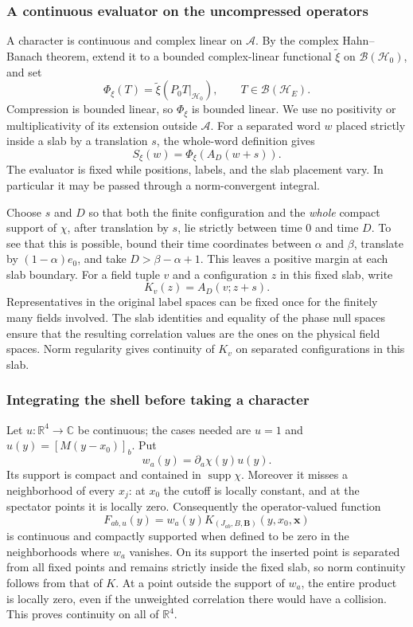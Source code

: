 \subsubsection{A continuous evaluator on the uncompressed operators}

A character is continuous and complex linear on $\mathcal A$. By the
complex Hahn--Banach theorem, extend it to a bounded complex-linear
functional $\widetilde\xi$ on $\mathcal B(\mathcal H_0)$, and set
\[
 \Phi_\xi(T)=\widetilde\xi(P_0T|_{\mathcal H_0}),
               \qquad T\in\mathcal B(\mathcal H_E).
\]
Compression is bounded linear, so $\Phi_\xi$ is bounded linear. We use
no positivity or multiplicativity of its extension outside $\mathcal A$.
For a separated word $w$ placed strictly inside a slab by a translation
$s$, the whole-word definition gives
\begin{equation}\label{eq:phase-fixed-evaluator}
             S_\xi(w)=\Phi_\xi(A_D(w+s)).
\end{equation}
The evaluator is fixed while positions, labels, and the slab placement
vary. In particular it may be passed through a norm-convergent integral.

Choose $s$ and $D$ so that both the finite configuration and the
\emph{whole} compact support of $\chi$, after translation by $s$, lie
strictly between time $0$ and time $D$. To see that this is possible,
bound their time coordinates between $\alpha$ and $\beta$, translate
by $(1-\alpha)e_0$, and take $D>\beta-\alpha+1$.
This leaves a positive margin at each slab boundary. For a field tuple
$v$ and a configuration $z$ in this fixed slab, write
\[
                         K_v(z)=A_D(v;z+s).
\]
Representatives in the original label spaces can be fixed once for the
finitely many fields involved. The slab identities and equality of the
phase null spaces ensure that the resulting correlation values are the
ones on the physical field spaces. Norm regularity gives continuity of
$K_v$ on separated configurations in this slab.

\subsubsection{Integrating the shell before taking a character}

Let $u:\mathbb R^4\to\mathbb C$ be continuous; the cases needed are
$u=1$ and $u(y)=[M(y-x_0)]_b$. Put
\[
             w_a(y)=\partial_a\chi(y)u(y).
\]
Its support is compact and contained in $\operatorname{supp}\chi$.
Moreover it misses a neighborhood of every $x_j$: at $x_0$ the cutoff
is locally constant, and at the spectator points it is locally zero.
Consequently the operator-valued function
\[
 F_{ab,u}(y)=w_a(y)
  K_{(J_{ab},B,\boldsymbol B)}(y,x_0,\boldsymbol x)
\]
is continuous and compactly supported when defined to be zero in the
neighborhoods where $w_a$ vanishes. On its support the inserted point
is separated from all fixed points and remains strictly inside the
fixed slab, so norm continuity follows from that of $K$.
At a point outside the support of $w_a$, the entire product is locally
zero, even if the unweighted correlation there would have a collision.
This proves continuity on all of $\mathbb R^4$.

